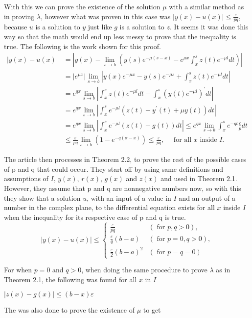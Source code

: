 \documentclass[mla8]{mla}
\begin{document}
\begin{paper}
With this we can prove the existence of the solution $\mu$ with a similar method as in proving $\lambda$, however what was proven in this case was $|y(x) - u(x)| \leq \frac{\varepsilon}{p q}$, because $u$ is a solution to $y$ just like $g$ is a solution to $z$. It seems it was done this way so that the math would end up less messy to prove that the inequality is true. The following is the work shown for this proof.
$$\begin{aligned}
    |y(x)-u(x)| & =\left|y(x)-\lim _{s \rightarrow b}\left(y(s) e^{-\mu(s-x)}-e^{\mu x} \int_x^s z(t) e^{-\mu l} d t\right)\right| \\
    & =\left|e^{\mu x}\right| \lim _{s \rightarrow b}\left|y(x) e^{-\mu x}-y(s) e^{-\mu s}+\int_x^s z(t) e^{-\mu l} d t\right| \\
    & =e^{q x} \lim _{s \rightarrow b}\left|\int_x^s z(t) e^{-\mu l} d t-\int_x^s\left(y(t) e^{-\mu l}\right)^{\prime} d t\right| \\
    & =e^{q x} \lim _{s \rightarrow b}\left|\int_x^s e^{-\mu l}\left(z(t)-y^{\prime}(t)+\mu y(t)\right) d t\right| \\
    & =e^{q x} \lim _{s \rightarrow b}\left|\int_x^s e^{-\mu l}(z(t)-g(t)) d t\right| \leq e^{q x} \lim _{s \rightarrow b} \int_x^s e^{-q t} \frac{\varepsilon}{p} d t \\
    & \leq \frac{\varepsilon}{p q} \lim _{s \rightarrow b}\left(1-e^{-q(\sigma-x)}\right) \leq \frac{\varepsilon}{p q}, \quad \text { for all } x \text{ inside } I .
\end{aligned}$$

The article then processes in Theorem 2.2, to prove the rest of the possible cases of p and q that could occur. They start off by using same definitions and assumptions of $I$, $y(x)$, $r(x)$, $g(x)$ and $z(x)$ and used in Theorem 2.1. However, they assume that p and q are nonnegative numbers now, so with this they show that a solution $u$, with an input of a value in $I$ and an output of a number in the complex plane, to the differential equation exists for all $x$ inside $I$ when the inequality for its respective case of p and q is true.
$$
|y(x)-u(x)| \leq \begin{cases}\frac{\varepsilon}{p q} & (\text { for } p, q>0), \\ \frac{\varepsilon}{q}(b-a) & (\text { for } p=0, q>0), \\ \frac{\varepsilon}{2}(b-a)^2 & (\text { for } p=q=0)\end{cases}
$$

For when $p = 0$ and $q > 0$, when doing the same procedure to prove $\lambda$ as in Theorem 2.1, the following was found for all $x$ in $I$
\begin{center}
    $|z(x)-g(x)| \leq(b-x) \varepsilon$
\end{center}
The was also done to prove the existence of $\mu$ to get


\end{paper}
\end{document}
